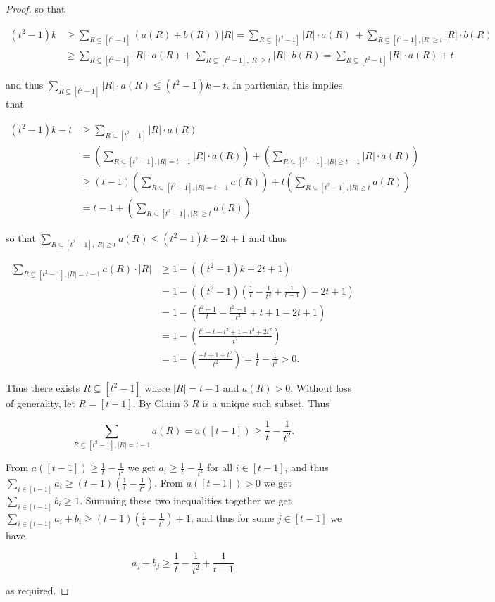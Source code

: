 \documentclass{article}
\begin{document}
\begin{proof}
\noindent
so that

\begin{align*}
(t^2-1)k &\geq \sum_{R \subseteq [t^2-1]} (a(R) + b(R))|R| = \sum_{R \subseteq [t^2-1]} |R| \cdot a(R) \ + \sum_{R \subseteq [t^2-1], |R| \geq t} |R| \cdot b(R) \\
&\geq \sum_{R \subseteq [t^2-1]} |R| \cdot a(R) + \sum_{R \subseteq [t^2-1], |R| \geq t} |R| \cdot b(R)  = \sum_{R \subseteq [t^2-1]} |R| \cdot a(R) + t
\end{align*}

\noindent
and thus $\sum_{R \subseteq [t^2-1]} |R| \cdot a(R) \leq (t^2-1)k - t$. In particular, this implies that 

\begin{align*}
(t^2-1)k - t &\geq \sum_{R \subseteq [t^2-1]} |R| \cdot a(R) \\
&= \left( \sum_{R \subseteq [t^2-1], |R| = t-1} |R| \cdot a(R) \right) + \left( \sum_{R \subseteq [t^2-1], |R| \geq t-1} |R| \cdot a(R) \right)  \\
&\geq (t-1)\left( \sum_{R \subseteq [t^2-1], |R| = t-1} a(R) \right) + t\left( \sum_{R \subseteq [t^2-1], |R| \geq t} a(R) \right) \\
&= t-1+ \left( \sum_{R \subseteq [t^2-1], |R| \geq t} a(R) \right)
\end{align*}

\noindent
so that $\sum_{R \subseteq [t^2-1], |R| \geq t} a(R) \leq (t^2-1)k-2t+1$ and thus 

\begin{align*}
\sum_{R \subseteq [t^2-1], |R| = t-1} a(R) \cdot |R| &\geq 1-((t^2-1)k-2t+1) \\
&= 1-((t^2-1)(\frac{1}{t} - \frac{1}{t^2} + \frac{1}{t-1})-2t+1) \\
&= 1-(\frac{t^2-1}{t} - \frac{t^2-1}{t^2} + t+1-2t+1) \\
&= 1 - (\frac{t^3-t-t^2+1 - t^3 + 2t^2}{t^2}) \\
&=  1 - (\frac{-t+1 + t^2}{t^2}) = \frac{1}{t} - \frac{1}{t^2} > 0.
\end{align*}

Thus there exists $R \subseteq [t^2-1]$ where $|R| = t-1$ and $a(R) > 0$. Without loss of generality, let $R = [t-1]$. By Claim 3 $R$ is a unique such subset. Thus

$$\sum_{R \subseteq [t^2-1], |R| = t-1} a(R) =  a([t-1]) \geq \frac{1}{t} - \frac{1}{t^2}.$$

\noindent
From $a([t-1]) \geq \frac{1}{t} - \frac{1}{t^2}$ we get $a_i \geq \frac{1}{t} - \frac{1}{t^2}$ for all $i \in [t-1]$, and thus $\sum_{i \in [t-1]} a_i \geq (t-1)(\frac{1}{t} - \frac{1}{t^2})$. From $a([t-1]) > 0$ we get $\sum_{i \in [t-1]} b_i \geq 1$. Summing these two inequalities together we get $\sum_{i \in [t-1]} a_i+b_i \geq (t-1)(\frac{1}{t} - \frac{1}{t^2}) + 1$, and thus for some $j \in [t-1]$ we have

$$a_j+b_j \geq \frac{1}{t} - \frac{1}{t^2} + \frac{1}{t-1}$$

\noindent
as required. 
\end{proof}
\end{document}
